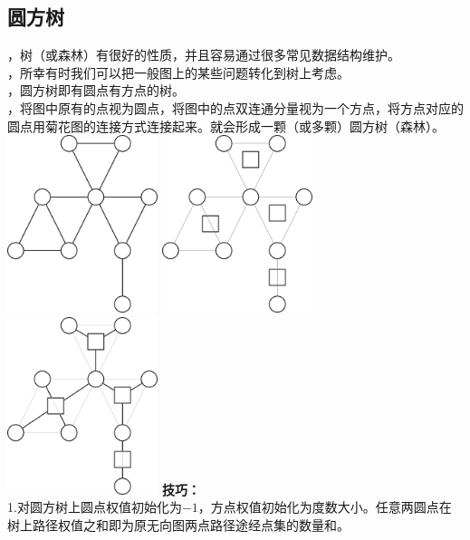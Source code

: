 \documentclass[a4paper]{book}
\begin{document}
\subsection{圆方树}
，树（或森林）有很好的性质，并且容易通过很多常见数据结构维护。\\
，所幸有时我们可以把一般图上的某些问题转化到树上考虑。\\
，圆方树即有圆点有方点的树。\\
，将图中原有的点视为圆点，将图中的点双连通分量视为一个方点，将方点对应的圆点用菊花图的连接方式连接起来。就会形成一颗（或多颗）圆方树（森林）。\\
\includegraphics[width=0.33\textwidth]{../photo/yfs1.png}
\includegraphics[width=0.33\textwidth]{../photo/yfs2.png}
\includegraphics[width=0.33\textwidth]{../photo/yfs3.png}
\noindent\textbf{技巧：}\\
\indent1.对圆方树上圆点权值初始化为$-1$，方点权值初始化为度数大小。任意两圆点在树上路径权值之和即为原无向图两点路径途经点集的数量和。
\end{document}
